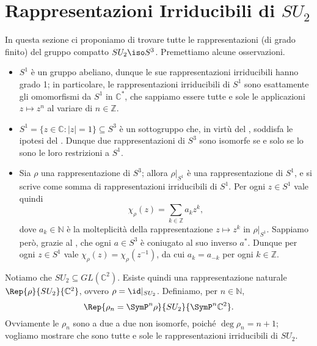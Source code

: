 \section{Rappresentazioni Irriducibili di $SU_2$}

In questa sezione ci proponiamo di trovare tutte le rappresentazioni (di grado finito) del gruppo compatto $SU_2\iso S^3$. Premettiamo alcune osservazioni.
\begin{itemize}
\item $S^1$ è un gruppo abeliano, dunque le sue rappresentazioni irriducibili hanno grado 1; in particolare, le rappresentazioni irriducibili di $S^1$ sono esattamente gli omomorfismi da $S^1$ in $\mathbb{C}^*$, che sappiamo essere tutte e sole le applicazioni $z\mapsto z^n$ al variare di $n\in\mathbb{Z}$.
\item $S^1=\{z\in\mathbb{C}:|z|=1\}\subseteq S^3$ è un sottogruppo che, in virtù del , soddisfa le ipotesi del . Dunque due rappresentazioni di $S^3$ sono isomorfe se e solo se lo sono le loro restrizioni a $S^1$.
\item Sia $\rho$ una rappresentazione di $S^3$; allora $\rho|_{S^1}$ è una rappresentazione di $S^1$, e si scrive come somma di rappresentazioni irriducibili di $S^1$. Per ogni $z\in S^1$ vale quindi
$$
\chi_\rho(z)=\sum_{k\in\mathbb{Z}}a_kz^k,
$$
dove $a_k\in\mathbb{N}$ è la molteplicità della rappresentazione $z\mapsto z^k$ in $\rho|_{S^1}$. Sappiamo però, grazie al , che ogni $a\in S^3$ è coniugato al suo inverso $a^*$. Dunque per ogni $z\in S^1$ vale $\chi_\rho(z)=\chi_\rho(z^{-1})$, da cui $a_k=a_{-k}$ per ogni $k\in\mathbb{Z}$.
\end{itemize}

Notiamo che $SU_2\subseteq GL(\mathbb{C}^2)$. Esiste quindi una rappresentazione naturale $\Rep{\rho}{SU_2}{\mathbb{C}^2}$, ovvero $\rho=\id|_{SU_2}$. Definiamo, per $n\in\mathbb{N}$,  
$$
\Rep{\rho_n=\SymP^n\rho}{SU_2}{\SymP^n\mathbb{C}^2}.
$$
Ovviamente le $\rho_n$ sono a due a due non isomorfe, poiché $\deg\rho_n=n+1$; vogliamo mostrare che sono tutte e sole le rappresentazioni irriducibili di $SU_2$.

